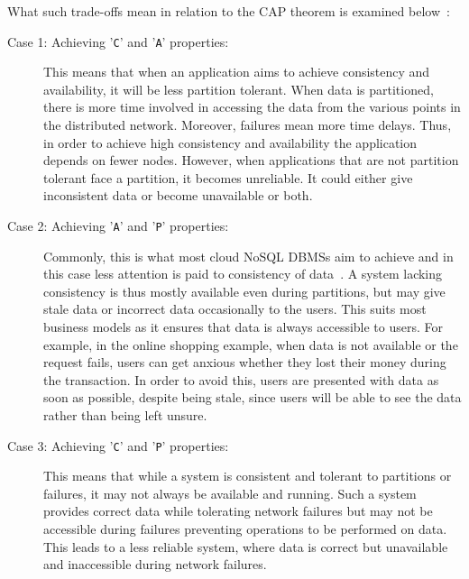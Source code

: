 What such trade-offs mean in relation to the CAP theorem is examined
below~\citep{abadi2,Tai,Brewer2,hp,Ramakrishnan}:

\begin{description}
	\item [Case 1: Achieving '\texttt{C}' and '\texttt{A}' properties:] This means
	that when an application aims to achieve consistency and availability, it will
	be less partition tolerant. When data is partitioned,   there is more time involved in accessing the data
	from the various points in the distributed network.   Moreover,   failures mean
	more time delays.   Thus, in order  to achieve high consistency and
	availability the application depends on fewer nodes.   However,   when
	applications that are not partition tolerant face a partition, it becomes
	unreliable.   It could either give inconsistent data or become unavailable or both. 
		
	\item [Case 2: Achieving '\texttt{A}' and '\texttt{P}' properties:] Commonly,
	this is what most cloud \ac{NoSQL} \acp{DBMS} aim to achieve and  in this case
	less attention is paid to consistency of data~\citep{Wada}.
	A system lacking consistency is thus mostly available even during partitions,
	but may give stale data or incorrect data occasionally to the users.   This
	suits most business models as it ensures that data is always accessible to
	users.  For example, in the online shopping example,   when data is not
	available or the request fails,   users can get anxious whether they lost their
	money during the transaction.   In order to avoid this, users are presented with
	data as soon as possible,   despite being stale,   since users will be able to
	see the data rather than being left unsure. 
	
	\item [Case 3: Achieving '\texttt{C}' and '\texttt{P}' properties:] This means
	that while a system is consistent and tolerant to partitions or
	failures,   it may not always be available and running.   Such a system 
	provides correct data while tolerating network failures but may not be
	accessible during failures preventing operations to be performed on data.   This
	leads to a less reliable system,   where data is correct but unavailable and
	inaccessible during network failures. 
	
	 
\end{description}

